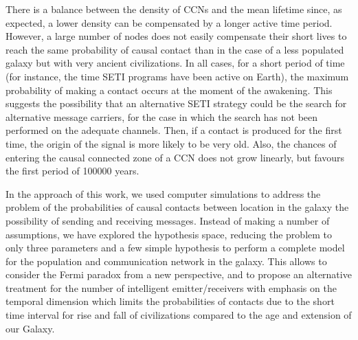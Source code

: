 \documentclass[crop]{CSLB}
\newcommand{\ceti}{CCN}
\newcommand{\cetis}{CCNs}
\begin{document}

There is a balance between the density of \cetis{} and the mean
lifetime since, as expected, a lower density can be compensated by a
longer active time period.
%
However, a large number of nodes does not easily compensate their
short lives to reach the same probability of causal contact than in
the case of a less populated galaxy but with very ancient
civilizations.
%
In all cases, for a short period of time (for instance, the time SETI
programs have been active on Earth), the maximum probability of making
a contact occurs at the moment of the awakening.
%
This suggests the possibility that an alternative SETI strategy could
be the search for alternative message carriers, for the case in which
the search has not been performed on the adequate channels.
%
Then, if a contact is produced for the first time, the origin of the
signal is more likely to be very old.
%
Also, the chances of entering the causal connected zone of a \ceti{}
does not grow linearly, but favours the first period of 100000 years.






In the approach of this work, we used computer simulations to address
the problem of the probabilities of causal contacts between location
in the galaxy the possibility of sending and receiving messages.
%
Instead of making a number of assumptions, we have explored the
hypothesis space, reducing the problem to only three parameters and a
few simple hypothesis to perform a complete model for the population and
communication network in the galaxy.
%
This allows to consider the Fermi paradox from a new perspective, and
to propose an alternative treatment for the number of intelligent
emitter/receivers with emphasis on the temporal dimension which limits
the probabilities of contacts due to the short time interval for
rise and fall of civilizations compared to the age and extension of
our Galaxy.









\setlength{\bibsep}{0.0pt}

\end{document}
